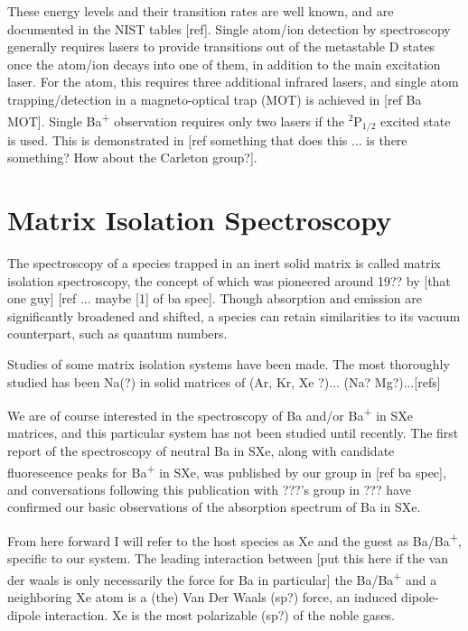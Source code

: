 These energy levels and their transition rates are well known, and are documented in the NIST tables [ref].  Single atom/ion detection by spectroscopy generally requires lasers to provide transitions out of the metastable D states once the atom/ion decays into one of them, in addition to the main excitation laser.  For the atom, this requires three additional infrared lasers, and single atom trapping/detection in a magneto-optical trap (MOT) is achieved in [ref Ba MOT].  Single Ba\textsuperscript{+} observation requires only two lasers if the $^{2}$P$_{1/2}$ excited state is used.  This is demonstrated in [ref something that does this ... is there something?  How about the Carleton group?].

\section{Matrix Isolation Spectroscopy}

The spectroscopy of a species trapped in an inert solid matrix is called matrix isolation spectroscopy, the concept of which was pioneered around 19?? by [that one guy] [ref ... maybe [1] of ba spec].  Though absorption and emission are significantly broadened and shifted, a species can retain similarities to its vacuum counterpart, such as quantum numbers.

Studies of some matrix isolation systems have been made.  The most thoroughly studied has been Na(?) in solid matrices of (Ar, Kr, Xe ?)... (Na? Mg?)...[refs]

We are of course interested in the spectroscopy of Ba and/or Ba\textsuperscript{+} in SXe matrices, and this particular system has not been studied until recently.  The first report of the spectroscopy of neutral Ba in SXe, along with candidate fluorescence peaks for Ba\textsuperscript{+} in SXe, was published by our group in [ref ba spec], and conversations following this publication with ???'s group in ??? have confirmed our basic observations of the absorption spectrum of Ba in SXe.  

From here forward I will refer to the host species as Xe and the guest as Ba/Ba\textsuperscript{+}, specific to our system.  The leading interaction between {\color{gray}[put this here if the van der waals is only necessarily the force for Ba in particular]} the Ba/Ba\textsuperscript{+} and a neighboring Xe atom is a {\color{gray}(the)} Van Der Waals (sp?) force, an induced dipole-dipole interaction.  Xe is the most polarizable (sp?) of the noble gases.  

